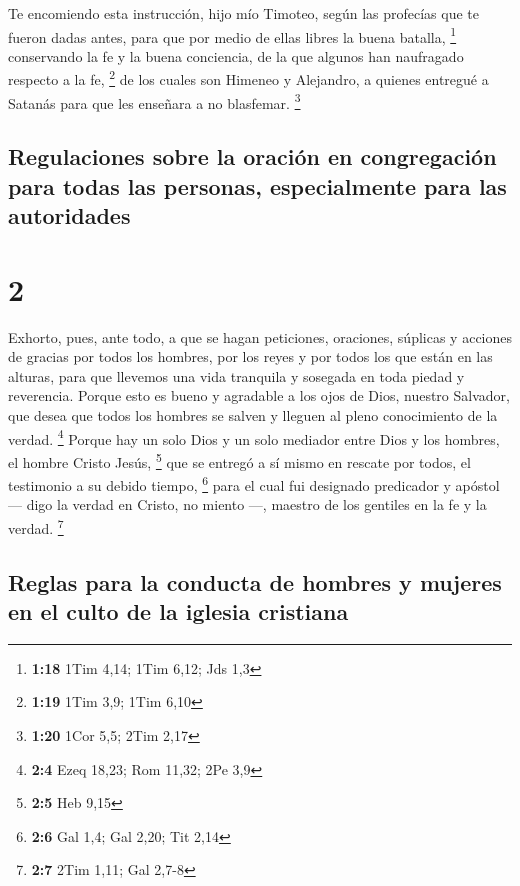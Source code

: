  Te encomiendo esta instrucción, hijo mío Timoteo, según
las profecías que te fueron dadas antes, para que por medio de ellas
libres la buena batalla, \footnote{\textbf{1:18} 1Tim 4,14; 1Tim 6,12;
  Jds 1,3}  conservando la fe y la buena conciencia, de
la que algunos han naufragado respecto a la fe, \footnote{\textbf{1:19}
  1Tim 3,9; 1Tim 6,10}  de los cuales son Himeneo y
Alejandro, a quienes entregué a Satanás para que les enseñara a no
blasfemar. \footnote{\textbf{1:20} 1Cor 5,5; 2Tim 2,17}

\hypertarget{regulaciones-sobre-la-oraciuxf3n-en-congregaciuxf3n-para-todas-las-personas-especialmente-para-las-autoridades}{%
\subsection{Regulaciones sobre la oración en congregación para todas las
personas, especialmente para las
autoridades}\label{regulaciones-sobre-la-oraciuxf3n-en-congregaciuxf3n-para-todas-las-personas-especialmente-para-las-autoridades}}

\hypertarget{section-1}{%
\section{2}\label{section-1}}

 Exhorto, pues, ante todo, a que se hagan peticiones,
oraciones, súplicas y acciones de gracias por todos los hombres,
 por los reyes y por todos los que están en las alturas,
para que llevemos una vida tranquila y sosegada en toda piedad y
reverencia.  Porque esto es bueno y agradable a los ojos
de Dios, nuestro Salvador,  que desea que todos los
hombres se salven y lleguen al pleno conocimiento de la verdad.
\footnote{\textbf{2:4} Ezeq 18,23; Rom 11,32; 2Pe 3,9} 
Porque hay un solo Dios y un solo mediador entre Dios y los hombres, el
hombre Cristo Jesús, \footnote{\textbf{2:5} Heb 9,15}  que
se entregó a sí mismo en rescate por todos, el testimonio a su debido
tiempo, \footnote{\textbf{2:6} Gal 1,4; Gal 2,20; Tit 2,14}
 para el cual fui designado predicador y apóstol --- digo
la verdad en Cristo, no miento ---, maestro de los gentiles en la fe y
la verdad. \footnote{\textbf{2:7} 2Tim 1,11; Gal 2,7-8}

\hypertarget{reglas-para-la-conducta-de-hombres-y-mujeres-en-el-culto-de-la-iglesia-cristiana}{%
\subsection{Reglas para la conducta de hombres y mujeres en el culto de
la iglesia
cristiana}\label{reglas-para-la-conducta-de-hombres-y-mujeres-en-el-culto-de-la-iglesia-cristiana}}

